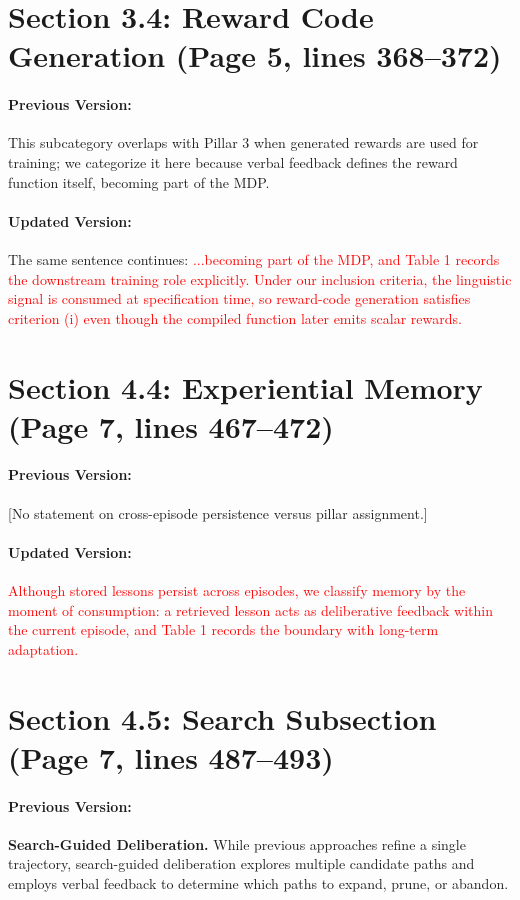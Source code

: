 \documentclass[11pt]{article}
\newcommand{\red}[1]{\textcolor{red}{#1}}
\begin{document}
\section{Section 3.4: Reward Code Generation (Page 5, lines 368--372)}

\paragraph{Previous Version:} This subcategory overlaps with Pillar 3 when generated rewards are used for training; we categorize it here because verbal feedback defines the reward function itself, becoming part of the MDP.

\paragraph{Updated Version:} The same sentence continues: \red{...becoming part of the MDP, and Table 1 records the downstream training role explicitly. Under our inclusion criteria, the linguistic signal is consumed at specification time, so reward-code generation satisfies criterion (i) even though the compiled function later emits scalar rewards.}

\section{Section 4.4: Experiential Memory (Page 7, lines 467--472)}

\paragraph{Previous Version:} [No statement on cross-episode persistence versus pillar assignment.]

\paragraph{Updated Version:} \red{Although stored lessons persist across episodes, we classify memory by the moment of consumption: a retrieved lesson acts as deliberative feedback within the current episode, and Table 1 records the boundary with long-term adaptation.}

\section{Section 4.5: Search Subsection (Page 7, lines 487--493)}

\paragraph{Previous Version:} \textbf{Search-Guided Deliberation.} While previous approaches refine a single trajectory, search-guided deliberation explores multiple candidate paths and employs verbal feedback to determine which paths to expand, prune, or abandon.
\end{document}

